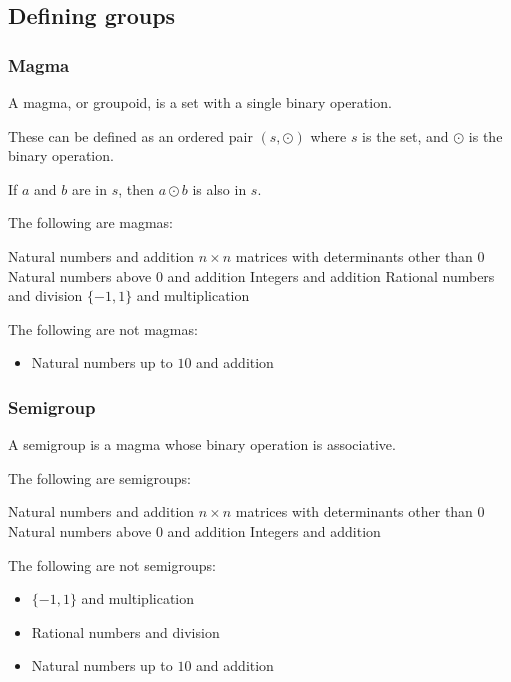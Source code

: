 
\subsection{Defining groups}

\subsubsection{Magma}

A magma, or groupoid, is a set with a single binary operation.

These can be defined as an ordered pair \((s,\odot )\) where \(s\) is the set, and \(\odot \) is the binary operation.

If \(a\) and \(b\) are in \(s\), then \(a\odot b\) is also in \(s\).

The following are magmas:

\begin{itemize}
\list Natural numbers and addition
\list \(n\times n\) matrices with determinants other than \(0\)
\list Natural numbers above \(0\) and addition
\list Integers and addition
\list Rational numbers and division
\list \(\{-1, 1\}\) and multiplication
\end{itemize}

The following are not magmas:

\begin{itemize}
\item Natural numbers up to \(10\) and addition
\end{itemize}

\subsubsection{Semigroup}

A semigroup is a magma whose binary operation is associative.

The following are semigroups:

\begin{itemize}
\list Natural numbers and addition
\list \(n\times n\) matrices with determinants other than \(0\)
\list Natural numbers above \(0\) and addition
\list Integers and addition
\end{itemize}

The following are not semigroups:

\begin{itemize}
\item \(\{-1, 1\}\) and multiplication
\item Rational numbers and division
\item Natural numbers up to \(10\) and addition
\end{itemize}


